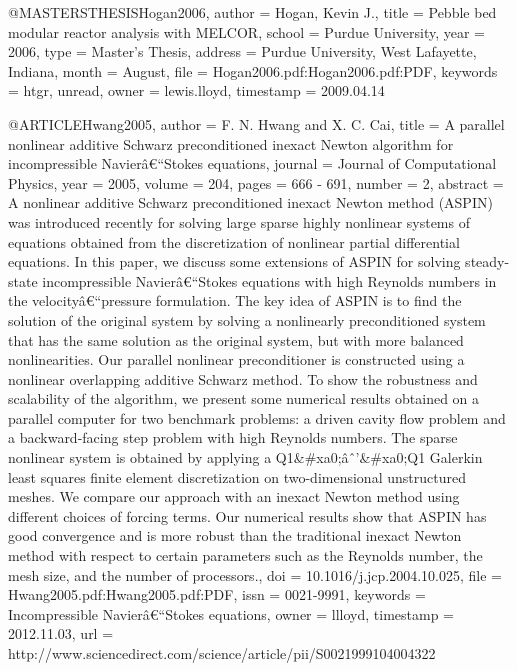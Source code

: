 {@MASTERSTHESIS{Hogan2006,
  author = {Hogan, Kevin J.},
  title = {Pebble bed modular reactor analysis with MELCOR},
  school = {Purdue University},
  year = {2006},
  type = {Master's Thesis},
  address = {Purdue University, West Lafayette, Indiana},
  month = {August},
  file = {Hogan2006.pdf:Hogan2006.pdf:PDF},
  keywords = {htgr, unread},
  owner = {lewis.lloyd},
  timestamp = {2009.04.14}
}

@ARTICLE{Hwang2005,
  author = {F. N. Hwang and X. C. Cai},
  title = {A parallel nonlinear additive Schwarz preconditioned inexact Newton
	algorithm for incompressible Navierâ€“Stokes equations},
  journal = {Journal of Computational Physics},
  year = {2005},
  volume = {204},
  pages = {666 - 691},
  number = {2},
  abstract = {A nonlinear additive Schwarz preconditioned inexact Newton method
	(ASPIN) was introduced recently for solving large sparse highly nonlinear
	systems of equations obtained from the discretization of nonlinear
	partial differential equations. In this paper, we discuss some extensions
	of ASPIN for solving steady-state incompressible Navierâ€“Stokes
	equations with high Reynolds numbers in the velocityâ€“pressure formulation.
	The key idea of ASPIN is to find the solution of the original system
	by solving a nonlinearly preconditioned system that has the same
	solution as the original system, but with more balanced nonlinearities.
	Our parallel nonlinear preconditioner is constructed using a nonlinear
	overlapping additive Schwarz method. To show the robustness and scalability
	of the algorithm, we present some numerical results obtained on a
	parallel computer for two benchmark problems: a driven cavity flow
	problem and a backward-facing step problem with high Reynolds numbers.
	The sparse nonlinear system is obtained by applying a Q1&#xa0;âˆ’&#xa0;Q1
	Galerkin least squares finite element discretization on two-dimensional
	unstructured meshes. We compare our approach with an inexact Newton
	method using different choices of forcing terms. Our numerical results
	show that ASPIN has good convergence and is more robust than the
	traditional inexact Newton method with respect to certain parameters
	such as the Reynolds number, the mesh size, and the number of processors.},
  doi = {10.1016/j.jcp.2004.10.025},
  file = {Hwang2005.pdf:Hwang2005.pdf:PDF},
  issn = {0021-9991},
  keywords = {Incompressible Navierâ€“Stokes equations},
  owner = {llloyd},
  timestamp = {2012.11.03},
  url = {http://www.sciencedirect.com/science/article/pii/S0021999104004322}
}

}
